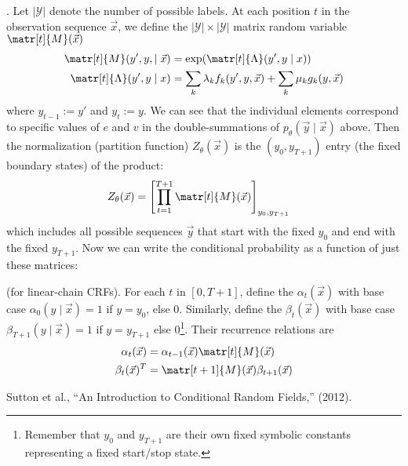 \documentclass[11pt]{article}
\begin{document}
\myspace
\p {}. Let $|\mathcal Y|$ denote the number of possible labels. At each position $t$ in the observation sequence $\vec x$, we define the $|\mathcal Y| \times |\mathcal Y|$ matrix random variable $\matr[t]{M}(\vec x)$
\begin{align}
\matr[t]{M}(y', y, \mid \vec x) &= \exp(\matr[t]{\Lambda}(y', y \mid x)) \\
\matr[t]{\Lambda}(y', y \mid x) &=
\sum_k \lambda_k f_k(y', y, \vec x) + 
\sum_k \mu_k g_k(y, \vec x)
\end{align}
where $y_{t-1} := y'$ and $y_t := y$. We can see that the individual elements correspond to specific values of $e$ and $v$ in the double-summations of $p_{\theta}(\vec y \mid \vec x)$ above. Then the normalization (partition function) $Z_{\theta}(\vec x)$ is the $(y_0, y_{T+1})$ entry (the fixed boundary states) of the product:
\begin{align}
Z_{\theta}(\vec x) &= \left[ \prod_{t = 1}^{T + 1} \matr[t]{M}(\vec x)  \right]_{y_0, y_{T + 1}}
\end{align} 
which includes all possible sequences $\vec y$ that start with the fixed $y_0$ and end with the fixed $y_{T + 1}$. Now we can write the conditional probability as a function of just these matrices:

\myspace
\p {} (for linear-chain CRFs). For each $t$ in $[0, T + 1]$, define the  $\alpha_t(\vec x)$ with base case $\alpha_0(y \mid \vec x) = 1$ if $y = y_0$, else 0. Similarly, define the  $\beta_t(\vec x)$ with base case $\beta_{T + 1}(y \mid \vec x) = 1$ if $y = y_{T+1}$ else 0\footnote{Remember that $y_0$ and $y_{T + 1}$ are their own fixed symbolic constants representing a fixed start/stop state.}. Their recurrence relations are
\begin{align}
\alpha_t(\vec x) &=  \alpha_{t - 1}(\vec x) \matr[t]{M}(\vec x) \\
\beta_t(\vec x)^T &= \matr[t+1]{M}(\vec x) \beta_{t + 1}(\vec x)
\end{align}



\vspace{-1em}
{\footnotesize Sutton et al., ``An Introduction to Conditional Random Fields,'' (2012).}
\end{document}
